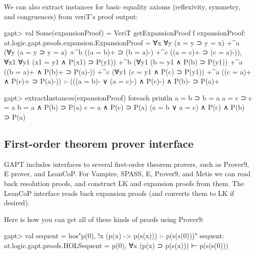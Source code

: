 \documentclass[a4paper,11pt]{article}
\begin{document}
We can also extract instances for basic equality axioms (reflexivity, symmetry,
and congruences) from veriT's proof output:
\begin{clilisting}
gapt> val Some(expansionProof) = VeriT getExpansionProof f
expansionProof: at.logic.gapt.proofs.expansion.ExpansionProof =
∀x ∀y (x = y ⊃ y = x)
  +^{a}
    (∀y (a = y ⊃ y = a) +^{b} ((a = b)+ ⊃ (b = a)-) +^{c} ((a = c)+ ⊃ (c = a)-)),
∀x1 ∀y1 (x1 = y1 ∧ P(x1) ⊃ P(y1))
  +^{b} (∀y1 (b = y1 ∧ P(b) ⊃ P(y1)) +^{a} ((b = a)+ ∧ P(b)+ ⊃ P(a)-))
  +^{c} (∀y1 (c = y1 ∧ P(c) ⊃ P(y1)) +^{a} ((c = a)+ ∧ P(c)+ ⊃ P(a)-))
:-
(((a = b)- ∨ (a = c)-) ∧ P(c)-) ∧ P(b)- ⊃ P(a)+

gapt> extractInstances(expansionProof) foreach println
a = b ⊃ b = a
a = c ⊃ c = a
b = a ∧ P(b) ⊃ P(a)
c = a ∧ P(c) ⊃ P(a)
(a = b ∨ a = c) ∧ P(c) ∧ P(b) ⊃ P(a)

\end{clilisting}

\subsection{First-order theorem prover interface}

GAPT includes interfaces to several first-order theorem provers, such as
Prover9, E prover, and LeanCoP.  For Vampire, SPASS, E, Prover9, and Metis we can read back
resolution proofs, and construct LK and expansion proofs from them.  The
LeanCoP interface reads back expansion proofs (and converts them to LK if desired).

Here is how you can get all of these kinds of proofs using Prover9:
\begin{clilisting}
gapt> val sequent = hos"p(0), !x (p(x) -> p(s(x))) :- p(s(s(0)))"
sequent: at.logic.gapt.proofs.HOLSequent = p(0), ∀x (p(x) ⊃ p(s(x))) ⊢ p(s(s(0)))

\end{clilisting}
\end{document}
